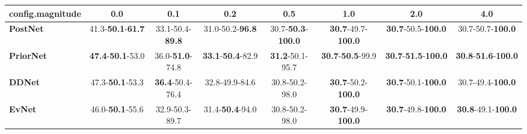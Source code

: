 \begin{tabular}{lccccccc}
\toprule
\textbf{config.magnitude} &                               0.0 &                      0.1 &                               0.2 &                                0.5 &                                1.0 &                                         2.0 &                                         4.0 \\
\midrule
\textbf{PostNet } &  41.3-\textbf{50.1}-\textbf{61.7} &  33.1-50.4-\textbf{89.8} &           31.0-50.2-\textbf{96.8} &  30.7-\textbf{50.3}-\textbf{100.0} &  \textbf{30.7}-49.7-\textbf{100.0} &           \textbf{30.7}-50.5-\textbf{100.0} &                    30.7-50.7-\textbf{100.0} \\
\textbf{PriorNet} &  \textbf{47.4}-\textbf{50.1}-53.0 &  36.0-\textbf{51.0}-74.8 &  \textbf{33.1}-\textbf{50.4}-82.9 &            \textbf{31.2}-50.1-95.7 &   \textbf{30.7}-\textbf{50.5}-99.9 &  \textbf{30.7}-\textbf{51.5}-\textbf{100.0} &  \textbf{30.8}-\textbf{51.6}-\textbf{100.0} \\
\textbf{DDNet   } &           47.3-\textbf{50.1}-53.3 &  \textbf{36.4}-50.4-76.4 &                    32.8-49.9-84.6 &                     30.8-50.2-98.0 &  \textbf{30.7}-50.2-\textbf{100.0} &           \textbf{30.7}-50.1-\textbf{100.0} &                    30.7-49.4-\textbf{100.0} \\
\textbf{EvNet   } &           46.0-\textbf{50.1}-55.6 &           32.9-50.3-89.7 &           31.4-\textbf{50.4}-94.0 &                     30.8-50.2-98.0 &  \textbf{30.7}-49.9-\textbf{100.0} &           \textbf{30.7}-49.8-\textbf{100.0} &           \textbf{30.8}-49.1-\textbf{100.0} \\
\bottomrule
\end{tabular}
